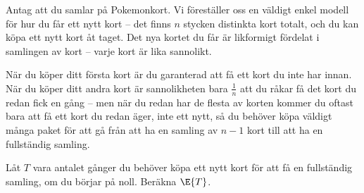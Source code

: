 \documentclass[nobib]{tufte-handout}
\begin{document}
\begin{xca}
    Antag att du samlar på Pokemonkort. Vi föreställer oss en väldigt enkel modell för hur du får ett nytt kort -- det finns $n$ stycken distinkta kort totalt, och du kan köpa ett nytt kort åt taget. Det nya kortet du får är likformigt fördelat i samlingen av kort -- varje kort är lika sannolikt.

    När du köper ditt första kort är du garanterad att få ett kort du inte har innan. När du köper ditt andra kort är sannolikheten bara $\frac{1}{n}$ att du råkar få det kort du redan fick en gång -- men när du redan har de flesta av korten kommer du oftast bara att få ett kort du redan äger, inte ett nytt, så du behöver köpa väldigt många paket för att gå från att ha en samling av $n-1$ kort till att ha en fullständig samling.

    Låt $T$ vara antalet gånger du behöver köpa ett nytt kort för att få en fullständig samling, om du börjar på noll. Beräkna $\E{T}$.
\end{xca}

%
%
\end{document}
